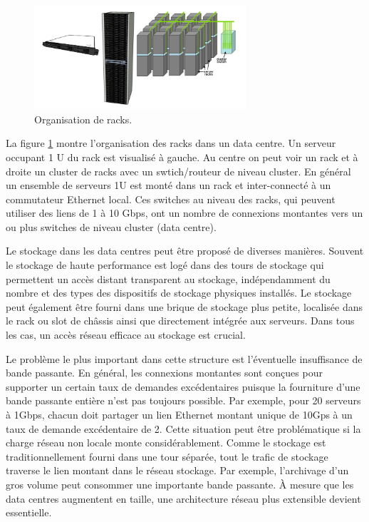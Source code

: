 \begin{figure}[h]
\begin{center}
\includegraphics[width=0.7\textwidth]{images/racks} 
\caption{Organisation de racks. \cite{datacenterAsComputerIntro}}\label{racks}
\end{center}
\end{figure}

La figure \ref{racks} montre l'organisation des racks dans un data centre. Un serveur occupant 1 U du rack est visualisé à gauche. Au centre on peut voir un rack et à droite un cluster de racks avec un swtich/routeur de niveau cluster. En général un ensemble de serveurs 1U est monté dans un rack et inter-connecté à un commutateur Ethernet local. Ces switches au niveau des racks, qui peuvent utiliser des liens de 1 à 10 Gbps, ont un nombre de connexions montantes vers un ou plus switches de niveau cluster (data centre).

Le stockage dans les data centres peut être proposé de diverses manières. Souvent le stockage de haute performance est logé dans des \og  tours de stockage \fg{} qui permettent un accès distant transparent au stockage, indépendamment du nombre et des types des dispositifs de stockage physiques installés. Le stockage peut également être fourni dans une \og  brique de stockage \fg{} plus petite, localisée dans le rack ou slot de châssis ainsi que directement intégrée aux serveurs. Dans tous les cas, un accès réseau efficace au stockage est crucial.

Le problème le plus important dans cette structure est l'éventuelle insuffisance de bande passante. En général, les connexions montantes sont conçues pour supporter un certain taux de demandes excédentaires puisque la fourniture d'une bande passante entière n'est pas toujours possible. Par exemple, pour 20 serveurs à 1Gbps, chacun doit partager un lien Ethernet montant unique de 10Gps à un taux de demande excédentaire de 2. Cette situation peut être problématique si la charge réseau non locale monte considérablement. Comme le stockage est traditionnellement fourni dans une tour séparée, tout le trafic de stockage traverse le lien montant dans le réseau stockage. Par exemple, l'archivage d'un gros volume peut consommer une importante bande passante. À mesure que les data centres augmentent en taille, une architecture réseau plus extensible devient essentielle.

